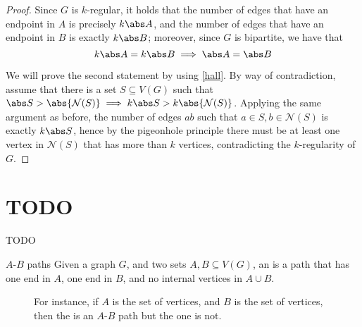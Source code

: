 \documentclass[a4paper, 12pt]{report}
\begin{document}
    \begin{proof}
        Since $G$ is $k$-regular, it holds that the number of edges that have an endpoint in $A$ is precisely $k \abs A$, and the number of edges that have an endpoint in $B$ is exactly $k \abs B$; moreover, since $G$ is bipartite, we have that $$k \abs A = k \abs B \implies \abs A = \abs B$$

        We will prove the second statement by using \cref{hall}. By way of contradiction, assume that there is a set $S \subseteq V(G)$ such that $\abs S > \abs{\mathcal N(S)} \implies k \abs S > k \abs{\mathcal N (S)}$. Applying the same argument as before, the number of edges $ab$ such that $a \in S, b \in \mathcal N (S)$ is exactly $k \abs S$, hence by the pigeonhole principle there must be at least one vertex in $\mathcal N (S)$ that has more than $k$ vertices, contradicting the $k$-regularity of $G$.
    \end{proof}

    \chapter{TODO}

    TODO 
    
    \begin{frameddefn}{$A$-$B$ paths}
        Given a graph $G$, and two sets $A, B \subseteq V(G)$, an  is a path that has one end in $A$, one end in $B$, and no internal vertices in $A \cup B$.
    \end{frameddefn}

    \begin{figure}[H]
        \centering
        \caption{For instance, if $A$ is the set of  vertices, and $B$ is the set of  vertices, then the  is an $A$-$B$ path but the  one is not.}
    \end{figure}
\end{document}
